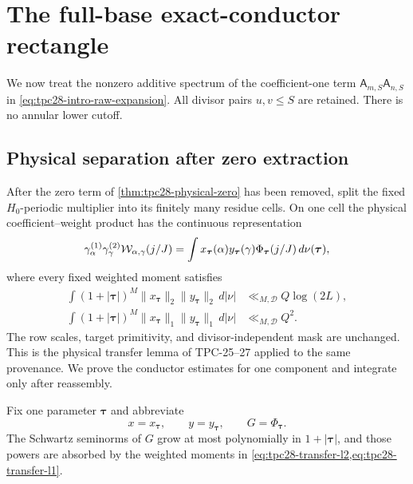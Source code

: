 \section{The full-base exact-conductor rectangle}
\label{sec:tpc28-full-base}

We now treat the nonzero additive spectrum of the coefficient-one term
\(\mathsf A_{m,S}\mathsf A_{n,S}\) in
\eqref{eq:tpc28-intro-raw-expansion}.  All divisor pairs $u,v\le S$
are retained.  There is no annular lower cutoff.

\subsection{Physical separation after zero extraction}

After the zero term of \cref{thm:tpc28-physical-zero} has been removed,
split the fixed $H_0$-periodic multiplier into its finitely many
residue cells.  On one cell the physical coefficient--weight product
has the continuous representation
\begin{equation}
 \gamma_\alpha^{(1)}\gamma_\gamma^{(2)}
 \mathcal W_{\alpha,\gamma}(j/J)
 =\int
 x_{\boldsymbol\tau}(\alpha)
 y_{\boldsymbol\tau}(\gamma)
 \Phi_{\boldsymbol\tau}(j/J)
 \,d\nu(\boldsymbol\tau),
 \label{eq:tpc28-continuous-transfer}
\end{equation}
where every fixed weighted moment satisfies
\begin{align}
 \int(1+|\boldsymbol\tau|)^M
 \|x_{\boldsymbol\tau}\|_2
 \|y_{\boldsymbol\tau}\|_2\,d|\nu|
 &\ll_{M,\mathscr D}Q\log(2L),
 \label{eq:tpc28-transfer-l2}\\
 \int(1+|\boldsymbol\tau|)^M
 \|x_{\boldsymbol\tau}\|_1
 \|y_{\boldsymbol\tau}\|_1\,d|\nu|
 &\ll_{M,\mathscr D}Q^2.
 \label{eq:tpc28-transfer-l1}
\end{align}
The row scales, target primitivity, and divisor-independent mask are
unchanged.  This is the physical transfer lemma of TPC-25--27 applied
to the same provenance.  We prove the conductor estimates for one
component and integrate only after reassembly.

Fix one parameter $\boldsymbol\tau$ and abbreviate
\begin{equation}
 x=x_{\boldsymbol\tau},\qquad
 y=y_{\boldsymbol\tau},\qquad
 G=\Phi_{\boldsymbol\tau}.
 \label{eq:tpc28-component-abbreviation}
\end{equation}
The Schwartz seminorms of $G$ grow at most polynomially in
$1+|\boldsymbol\tau|$, and those powers are absorbed by the weighted
moments in \cref{eq:tpc28-transfer-l2,eq:tpc28-transfer-l1}.


